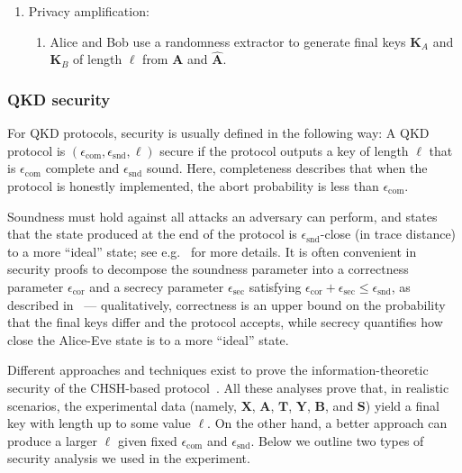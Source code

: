 \documentclass[aps,reprint,showpacs,superscriptaddress]{revtex4-2}
\begin{document}
\begin{enumerate}
\begin{enumerate}
\begin{equation}
		=\frac{\sum_{i:s_{i}=t_{i}=0}\omega(

			{a}_{i},b_{i},x_{i},y_{i})}{n}.
		\end{equation}
		\item If $\beta_\mathrm{freq}<\gamma_A\gamma_B\omega_{\mathrm{exp}}-\delta$, Alice and Bob abort the protocol.
	\end{enumerate}
	\item Privacy amplification:
	\begin{enumerate}
		\item Alice and Bob use a randomness extractor to generate final keys $\mathbf{K}_{A}$ and $\mathbf{K}_{B}$ of length $\ell$ from $\mathbf{A}$ and $\hat{\mathbf{A}}$.
	\end{enumerate}
\end{enumerate}

\subsubsection{QKD security}

For QKD protocols, security is usually defined in the following way:
A QKD protocol is $(\epsilon_{\mathrm{com}},\epsilon_{\mathrm{snd}},\ell)$ secure if the protocol outputs a key of length $\ell$ that is $\epsilon_{\mathrm{com}}$ complete and $\epsilon_{\mathrm{snd}}$ sound.
Here, completeness describes that when the protocol is honestly implemented, the abort probability is less than $\epsilon_{\mathrm{com}}$.

Soundness must hold against all attacks an adversary can perform,
and states that the state produced at the end of the protocol is $\epsilon_{\mathrm{snd}}$-close (in trace distance) to a more ``ideal'' state; see e.g.~\cite{PR22,di_security_review2} for more details. It is often convenient in security proofs to decompose the soundness parameter into a correctness parameter $\epsilon_{\mathrm{cor}}$ and a secrecy parameter $\epsilon_{\mathrm{sec}}$ satisfying $\epsilon_{\mathrm{cor}}+\epsilon_{\mathrm{sec}}\leqslant\epsilon_{\mathrm{snd}}$, as described in~\cite{PR22}
--- qualitatively, correctness is an upper bound on the probability that the final keys differ and the protocol accepts, while secrecy quantifies how close the Alice-Eve state is to a more ``ideal'' state.

Different approaches and techniques exist to prove the information-theoretic security of the CHSH-based protocol~\cite{arnon2018practical,VaziraniVidick2014Fully,MillerShi2016Robust,ZhangEtAl2023Quantum}.
All these analyses prove that,
in realistic scenarios,
the experimental data (namely, $\mathbf{X}$, $\mathbf{A}$, $\mathbf{T}$, $\mathbf{Y}$, $\mathbf{B}$, and $\mathbf{S}$) yield a final key with length up to some value $\ell$.
On the other hand, a better approach can produce a larger $\ell$ given fixed $\epsilon_{\mathrm{com}}$ and $\epsilon_{\mathrm{snd}}$.
Below we outline two types of security analysis we used in the experiment.
\end{document}
